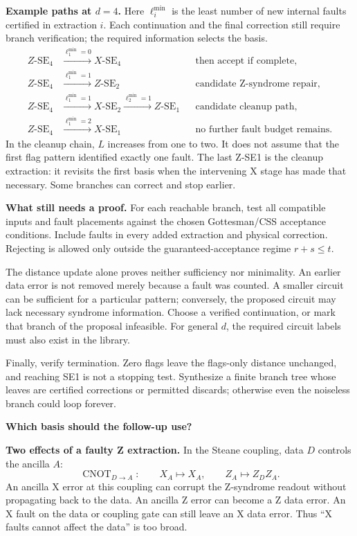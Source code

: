 \documentclass[11pt,a4paper]{article}
\newcommand{\SE}[2]{\ensuremath{#1\text{-}\mathrm{SE}_{#2}}}
\begin{document}
\textbf{Example paths at $d=4$.}
Here $\ell_i^{\min}$ is the least number of new internal faults certified
in extraction $i$. Each continuation and the final correction still require
branch verification; the required information selects the basis.
\begin{align*}
 \SE{Z}{4}&\xrightarrow{\ell_1^{\min}=0}\SE{X}{4}
     &&\text{then accept if complete},\\[4pt]
 \SE{Z}{4}&\xrightarrow{\ell_1^{\min}=1}\SE{Z}{2}
     &&\text{candidate Z-syndrome repair},\\[4pt]
 \SE{Z}{4}&\xrightarrow{\ell_1^{\min}=1}\SE{X}{2}
          \xrightarrow{\ell_2^{\min}=1}\SE{Z}{1}
     &&\text{candidate cleanup path},\\[4pt]
 \SE{Z}{4}&\xrightarrow{\ell_1^{\min}=2}\SE{X}{1}
     &&\text{no further fault budget remains}.
\end{align*}
In the cleanup chain, $L$ increases from one to two. It does not assume that
the first flag pattern identified exactly one fault. The last Z-SE1 is the
cleanup extraction: it revisits the first basis when the intervening X stage
has made that necessary. Some branches can correct and stop earlier.

\textbf{What still needs a proof.}
For each reachable branch, test all compatible inputs and fault placements
against the chosen Gottesman/CSS acceptance conditions. Include faults in
every added extraction and physical correction. Rejecting is allowed only
outside the guaranteed-acceptance regime $r+s\leq t$.

The distance update alone proves neither sufficiency nor minimality.
An earlier data error is not removed merely because a fault was counted.
A smaller circuit can be sufficient for a particular pattern; conversely,
the proposed circuit may lack necessary syndrome information. Choose a
verified continuation, or mark that branch of the proposal infeasible.
For general $d$, the required circuit labels must also exist in the library.

Finally, verify termination. Zero flags leave the flags-only distance
unchanged, and reaching SE1 is not a stopping test. Synthesize a finite
branch tree whose leaves are certified corrections or permitted discards;
otherwise even the noiseless branch could loop forever.

\clearpage
{\LARGE\bfseries Which basis should the follow-up use?}\par

\textbf{Two effects of a faulty Z extraction.}
In the Steane coupling, data $D$ controls the ancilla $A$:
\[
 \operatorname{CNOT}_{D\to A}:\qquad
 X_A\longmapsto X_A,\qquad Z_A\longmapsto Z_DZ_A.
\]
An ancilla X error at this coupling can corrupt the Z-syndrome readout
without propagating back to the data. An ancilla Z error can become a Z data
error. An X fault on the data or coupling gate can still leave an X data
error. Thus ``X faults cannot affect the data'' is too broad.
\end{document}
